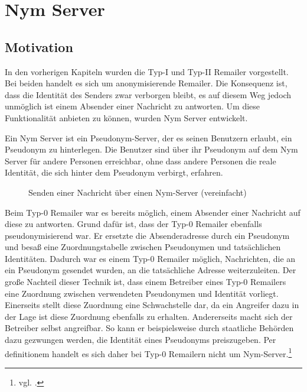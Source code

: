 \chapter{Nym Server}

\section{Motivation}
In den vorherigen Kapiteln wurden die Typ-I und Typ-II Remailer vorgestellt. Bei beiden handelt es sich um anonymisierende Remailer. Die Konsequenz ist, dass die Identität des Senders zwar verborgen bleibt, es auf diesem Weg jedoch unmöglich ist einem Absender einer Nachricht zu antworten. Um diese Funktionalität anbieten zu können, wurden Nym Server entwickelt.

Ein Nym Server ist ein Pseudonym-Server, der es seinen Benutzern erlaubt, ein Pseudonym zu hinterlegen. Die Benutzer sind über ihr Pseudonym auf dem Nym Server für andere Personen  erreichbar, ohne dass andere Personen die reale Identität, die sich hinter dem Pseudonym verbirgt, erfahren.

\begin{figure}
	\centering
	\begin{sequencediagram}
	\end{sequencediagram}
	\caption{Senden einer Nachricht über einen Nym-Server (vereinfacht)}
\end{figure}

Beim Typ-0 Remailer war es bereits möglich, einem Absender einer Nachricht auf diese zu antworten. Grund dafür ist, dass der Typ-0 Remailer ebenfalls pseudonymisierend war. Er ersetzte die Absenderadresse durch ein Pseudonym und besaß eine Zuordnungstabelle zwischen Pseudonymen und tatsächlichen Identitäten. Dadurch war es einem Typ-0 Remailer möglich, Nachrichten, die an ein Pseudonym gesendet wurden, an die tatsächliche Adresse weiterzuleiten. Der große Nachteil dieser Technik ist, dass einem Betreiber eines Typ-0 Remailers eine Zuordnung zwischen verwendeten Pseudonymen und Identität vorliegt. Einerseits stellt diese Zuordnung eine Schwachstelle dar, da ein Angreifer dazu in der Lage ist diese Zuordnung ebenfalls zu erhalten. Andererseits macht sich der Betreiber selbst angreifbar. So kann er beispielsweise durch staatliche Behörden dazu gezwungen werden, die Identität eines Pseudonyms preiszugeben. Per definitionem handelt es sich daher bei Typ-0 Remailern nicht um Nym-Server.\footnote{vgl. \cite{nymdefinition}.}

